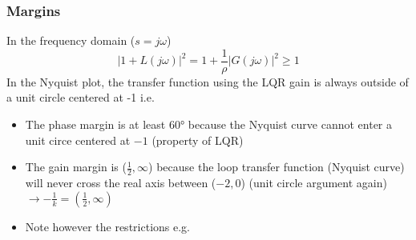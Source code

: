 \subsubsection{Margins}
In the frequency domain ($s=j\omega$)
\noindent\begin{equation*}
    \left|1+L(j\omega)\right|^2=1+\frac1\rho\left|G(j\omega)\right|^2\geq1
\end{equation*}
In the Nyquist plot, the transfer function using the LQR gain is always outside of a unit circle centered at -1 i.e.
\begin{itemize}
    \item The phase margin is at least 60° because the Nyquist curve cannot enter a unit circe centered at $-1$ (property of LQR)
    \item The gain margin is ($\frac{1}{2},\infty$) because the loop transfer function (Nyquist curve) will never cross the real axis between ($-2, 0$) (unit circle argument again)\newline $\to -\frac{1}{k} = (\frac{1}{2}, \infty)$
    \item Note however the restrictions e.g.\ \cite{539438}
\end{itemize}